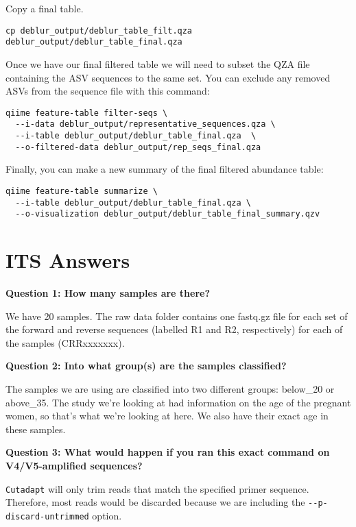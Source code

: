 \documentclass[
]{book}
\begin{document}
Copy a final table.

\begin{verbatim}
cp deblur_output/deblur_table_filt.qza deblur_output/deblur_table_final.qza
\end{verbatim}

Once we have our final filtered table we will need to subset the QZA file containing the ASV sequences to the same set. You can exclude any removed ASVs from the sequence file with this command:

\begin{verbatim}
qiime feature-table filter-seqs \
  --i-data deblur_output/representative_sequences.qza \
  --i-table deblur_output/deblur_table_final.qza  \
  --o-filtered-data deblur_output/rep_seqs_final.qza
\end{verbatim}

Finally, you can make a new summary of the final filtered abundance table:

\begin{verbatim}
qiime feature-table summarize \
  --i-table deblur_output/deblur_table_final.qza \
  --o-visualization deblur_output/deblur_table_final_summary.qzv
\end{verbatim}

\section{ITS Answers}\label{its-answers}

\textbf{Question 1: How many samples are there?}

We have 20 samples. The raw data folder contains one fastq.gz file for each set of the forward and reverse sequences (labelled R1 and R2, respectively) for each of the samples (CRRxxxxxxx).

\textbf{Question 2: Into what group(s) are the samples classified?}

The samples we are using are classified into two different groups: below\_20 or above\_35. The study we're looking at had information on the age of the pregnant women, so that's what we're looking at here. We also have their exact age in these samples.

\textbf{Question 3: What would happen if you ran this exact command on V4/V5-amplified sequences?}

\texttt{Cutadapt} will only trim reads that match the specified primer sequence. Therefore, most reads would be discarded because we are including the \texttt{-\/-p-discard-untrimmed} option.
\end{document}
